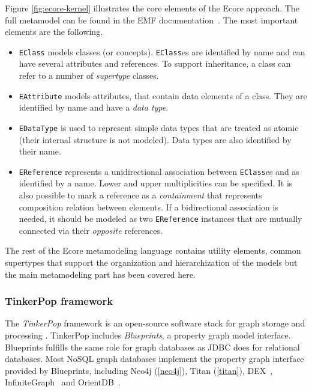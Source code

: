 Figure \ref{fig:ecore-kernel} illustrates the core elements of the Ecore approach. The full metamodel can be found in the EMF documentation~\cite{ecore}. The most important elements are the following.
 
\begin{itemize}
  \item \verb+EClass+ models classes (or concepts). \verb+EClass+es are identified by name and can have several attributes and references. To support inheritance, a class can refer to a number of \emph{supertype} classes.
  \item \verb+EAttribute+ models attributes, that contain data elements of a class. They are identified by name and have a \emph{data type}.
  \item \verb+EDataType+ is used to represent simple data types that are treated as atomic (their internal structure is not modeled). Data types are also identified by their name.
  \item \verb+EReference+ represents a unidirectional association between \verb+EClass+es and as identified by a name. Lower and upper multiplicities can be specified. It is also possible to mark a reference as a \emph{containment} that represents composition relation between elements. If a bidirectional association is needed, it should be modeled as two \verb+EReference+ instances that are mutually connected via their \emph{opposite} references.
\end{itemize}

The rest of the Ecore metamodeling language contains utility elements, common supertypes that support the organization and hierarchization of the models but the main metamodeling part has been covered here.

\subsubsection{TinkerPop framework}

The \emph{TinkerPop} framework is an open-source software stack for graph storage and processing \cite{TinkerPop}. TinkerPop includes \emph{Blueprints}, a property graph model interface. Blueprints fulfills the same role for graph databases as JDBC does for relational databases. Most NoSQL graph databases implement the property graph interface provided by Blueprints, including Neo4j (\autoref{neo4j}), Titan (\autoref{titan}), DEX~\cite{DEX}, InfiniteGraph~\cite{InfiniteGraph} and OrientDB~\cite{OrientDB}.

 
